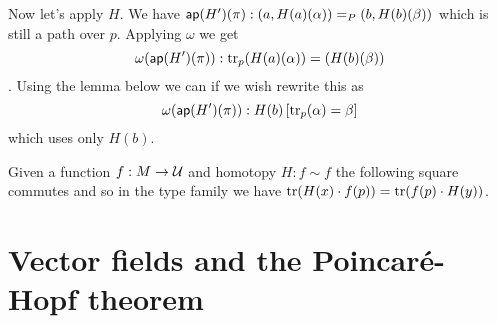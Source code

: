 \documentclass[12pt]{article}
\begin{document}
Now let's apply \( H \). We have \( \mathsf{ap}(H')(\pi):(a,H(a)(\alpha))=_P(b,H(b)(\beta)) \) which is still a path over \( p \). Applying \( \omega \) we get \[ \omega(\mathsf{ap}(H')(\pi)):\mathrm{tr}_p(H(a)(\alpha))=(H(b)(\beta)) \]. Using the lemma below we can if we wish rewrite this as 
\[ 
\omega(\mathsf{ap}(H')(\pi)):H(b)\left[\mathrm{tr}_p(\alpha)=\beta\right]
\]
which uses only \( H(b) \).

\begin{mylemma}
Given a function \( f:M\to\mathcal{U} \) and homotopy \( H:f\sim f \) the following square commutes and so in the type family we have \( \mathrm{tr}(H(x)\cdot f(p)) = \mathrm{tr}(f(p)\cdot H(y)) \).
\end{mylemma}
\begin{center}
\end{center}


 
\section{Vector fields and the Poincaré-Hopf theorem}
 

\end{document}
